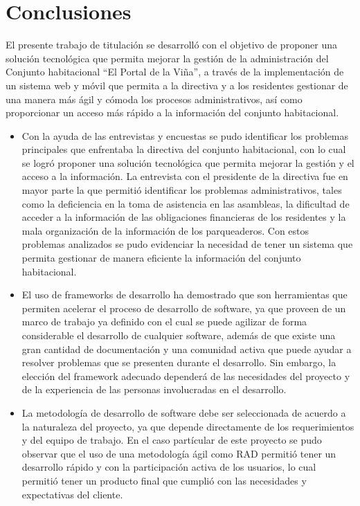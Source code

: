 \section{Conclusiones}

El presente trabajo de titulación se desarrolló con el objetivo de proponer una solución tecnológica que permita mejorar la gestión de la administración del Conjunto habitacional  {\textquotedblleft}El Portal de la Viña{\textquotedblright}, a través de la implementación de un sistema web y móvil que permita a la directiva y a los residentes gestionar de una manera más ágil y cómoda los procesos administrativos, así como proporcionar un acceso más rápido a la información del conjunto habitacional.

\begin{itemize}
    \item Con la ayuda de las entrevistas y encuestas se pudo identificar los problemas principales que enfrentaba la directiva del conjunto habitacional, con lo cual se logró proponer una solución tecnológica que permita mejorar la gestión y el acceso a la información.
    La entrevista con el presidente de la directiva fue en mayor parte la que permitió identificar los problemas administrativos, tales como la deficiencia en la toma de asistencia en las asambleas, la dificultad de acceder a la información de las obligaciones financieras de los residentes y la mala organización de la información de los parqueaderos.
    Con estos problemas analizados se pudo evidenciar la necesidad de tener un sistema que permita gestionar de manera eficiente la información del conjunto habitacional.
    \item El uso de frameworks de desarrollo ha demostrado que son herramientas que permiten acelerar el proceso de desarrollo de software, ya que proveen de un marco de trabajo ya definido con el cual se puede agilizar de forma considerable el desarrollo de cualquier software, además de que existe una gran cantidad de documentación y una comunidad activa que puede ayudar a resolver problemas que se presenten durante el desarrollo.
    Sin embargo, la elección del framework adecuado dependerá de las necesidades del proyecto y de la experiencia de las personas involucradas en el desarrollo.
    \item La metodología de desarrollo de software debe ser seleccionada de acuerdo a la naturaleza del proyecto, ya que depende directamente de los requerimientos y del equipo de trabajo.
    En el caso partícular de este proyecto se pudo observar que el uso de una metodología ágil como RAD permitió tener un desarrollo rápido y con la participación activa de los usuarios, lo cual permitió tener un producto final que cumplió con las necesidades y expectativas del cliente.

\end{itemize}
